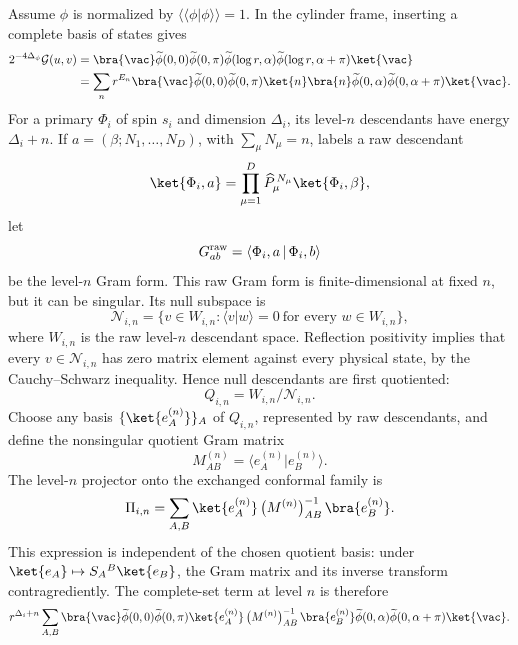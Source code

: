 Assume \(\phi\) is normalized by
\(\langle\!\langle\phi|\phi\rangle\!\rangle=1\).  In the cylinder frame,
inserting a complete basis of states gives
\begin{align}
  2^{-4\Delta_\phi}\mathcal G(u,v)
  &=
  \bra{\vac}
    \widetilde\phi(0,0)\widetilde\phi(0,\pi)
    \widetilde\phi(\log r,\alpha)
    \widetilde\phi(\log r,\alpha+\pi)
  \ket{\vac}
  \notag\\
  &=
  \sum_n r^{E_n}
  \bra{\vac}
    \widetilde\phi(0,0)\widetilde\phi(0,\pi)
  \ket{n}
  \bra{n}
    \widetilde\phi(0,\alpha)\widetilde\phi(0,\alpha+\pi)
  \ket{\vac}.
  \label{eq:cylinder-four-point-complete-set}
\end{align}
For a primary \(\Phi_i\) of spin \(s_i\) and dimension \(\Delta_i\), its
level-\(n\) descendants have energy \(\Delta_i+n\).  If
\(a=(\beta;N_1,\ldots,N_D)\), with \(\sum_\mu N_\mu=n\), labels a raw
descendant
\[
  \ket{\Phi_i,a}
  =
  \prod_{\mu=1}^D \widehat P_\mu^{\,N_\mu}
  \ket{\Phi_i,\beta},
\]
let
\[
  G^{\rm raw}_{ab}
  =
  \langle
    \Phi_i,a\,|\,\Phi_i,b
  \rangle
\]
be the level-\(n\) Gram form.  This raw Gram form is finite-dimensional at
fixed \(n\), but it can be singular.  Its null subspace is
\[
  \mathcal N_{i,n}
  =
  \{v\in W_{i,n}:\langle v|w\rangle=0\ \text{for every }w\in W_{i,n}\},
\]
where \(W_{i,n}\) is the raw level-\(n\) descendant space.  Reflection
positivity implies that every \(v\in\mathcal N_{i,n}\) has zero matrix element
against every physical state, by the Cauchy--Schwarz inequality.  Hence null
descendants are first quotiented:
\[
  Q_{i,n}=W_{i,n}/\mathcal N_{i,n}.
\]
Choose any basis \(\{\ket{e_A^{(n)}}\}_A\) of \(Q_{i,n}\), represented by raw
descendants, and define the nonsingular quotient Gram matrix
\[
  M^{(n)}_{AB}
  =
  \langle e_A^{(n)}|e_B^{(n)}\rangle .
\]
The level-\(n\) projector onto the exchanged conformal family is
\begin{equation}
  \Pi_{i,n}
  =
  \sum_{A,B}
  \ket{e_A^{(n)}}\,
  \bigl(M^{(n)}\bigr)^{-1}_{AB}\,
  \bra{e_B^{(n)}} .
  \label{eq:radial-block-level-projector}
\end{equation}
This expression is independent of the chosen quotient basis: under
\(\ket{e_A}\mapsto S_A{}^B\ket{e_B}\), the Gram matrix and its inverse
transform contragrediently.  The complete-set term at level \(n\) is therefore
\begin{equation}
  r^{\Delta_i+n}
  \sum_{A,B}
  \bra{\vac}
    \widetilde\phi(0,0)\widetilde\phi(0,\pi)
  \ket{e_A^{(n)}}\,
  \bigl(M^{(n)}\bigr)^{-1}_{AB}\,
  \bra{e_B^{(n)}}
    \widetilde\phi(0,\alpha)\widetilde\phi(0,\alpha+\pi)
  \ket{\vac}.
  \label{eq:radial-block-level-gram-inversion}
\end{equation}
